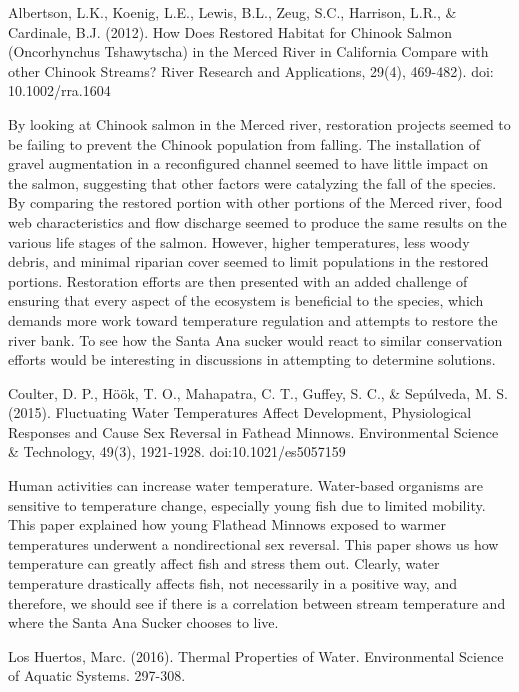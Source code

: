 \documentclass{article}
\begin{document}
Albertson, L.K., Koenig, L.E., Lewis, B.L., Zeug, S.C., Harrison, L.R., \& Cardinale, B.J. (2012). How Does Restored Habitat for Chinook Salmon (Oncorhynchus Tshawytscha) in the Merced River in California Compare with other Chinook Streams? River Research and Applications, 29(4), 469-482). doi: 10.1002/rra.1604

By looking at Chinook salmon in the Merced river, restoration projects seemed to be failing to prevent the Chinook population from falling. The installation of gravel augmentation in a reconfigured channel seemed to have little impact on the salmon, suggesting that other factors were catalyzing the fall of the species. By comparing the restored portion with other portions of the Merced river, food web characteristics and flow discharge seemed to produce the same results on the various life stages of the salmon. However, higher temperatures, less woody debris, and minimal riparian cover seemed to limit populations in the restored portions. Restoration efforts are then presented with an added challenge of ensuring that every aspect of the ecosystem is beneficial to the species, which demands more work toward temperature regulation and attempts to restore the river bank. To see how the Santa Ana sucker would react to similar conservation efforts would be interesting in discussions in attempting to determine solutions. 

Coulter, D. P., Höök, T. O., Mahapatra, C. T., Guffey, S. C., \& Sepúlveda, M. S. (2015). Fluctuating Water Temperatures Affect Development, Physiological Responses and Cause Sex Reversal in Fathead Minnows. Environmental Science \& Technology, 49(3), 1921-1928. doi:10.1021/es5057159

Human activities can increase water temperature. Water-based organisms are sensitive to temperature change, especially young fish due to limited mobility. This paper explained how young Flathead Minnows exposed to warmer temperatures underwent a nondirectional sex reversal. This paper shows us how temperature can greatly affect fish and stress them out. Clearly, water temperature drastically affects fish, not necessarily in a positive way, and therefore, we should see if there is a correlation between stream temperature and where the Santa Ana Sucker chooses to live.

Los Huertos, Marc. (2016). Thermal Properties of Water. Environmental Science of Aquatic Systems. 297-308.
\end{document}
